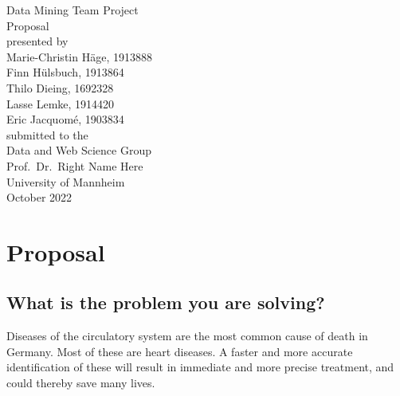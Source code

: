 \documentclass[11pt,titlepage,oneside,openany]{book}
\begin{document}
\begin{titlepage}
	\vspace*{2cm}
  \begin{center}
   {\Large Data Mining Team Project\\}
   \vspace{2cm} 
   {Proposal\\}
   \vspace{2cm}
   {presented by\\
    Marie-Christin Häge, 1913888 \\
    Finn Hülsbuch, 1913864 \\
    Thilo Dieing, 1692328 \\
    Lasse Lemke, 1914420 \\
    Eric Jacquomé, 1903834 \\
   }
   \vspace{1cm} 
   {submitted to the\\
    Data and Web Science Group\\
    Prof.\ Dr.\ Right Name Here\\
    University of Mannheim\\} \vspace{2cm}
   {October 2022}
  \end{center}
\end{titlepage} 






\newpage



\chapter{Proposal}
\section{What is the problem you are solving?}
\label{sec:problem}

Diseases of the circulatory system are the most common cause of death in Germany. 
Most of these are heart diseases. A faster and more accurate identification of these will result in immediate and more precise treatment, and could thereby save many lives.
\end{document}
